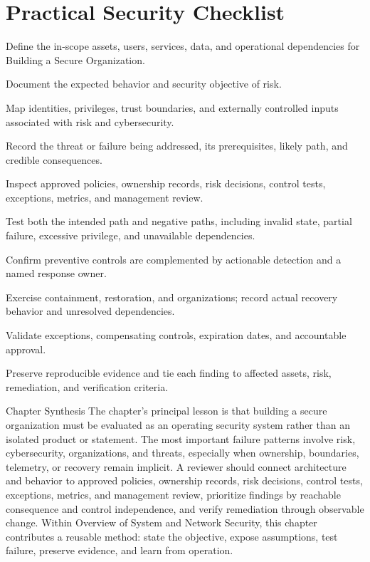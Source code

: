 \documentclass[11pt,letterpaper]{article}
\begin{document}
\section*{Practical Security Checklist}
\begin{CornellChecklist}
\item Define the in-scope assets, users, services, data, and operational dependencies for Building a Secure Organization.
\item Document the expected behavior and security objective of risk.
\item Map identities, privileges, trust boundaries, and externally controlled inputs associated with risk and cybersecurity.
\item Record the threat or failure being addressed, its prerequisites, likely path, and credible consequences.
\item Inspect approved policies, ownership records, risk decisions, control tests, exceptions, metrics, and management review.
\item Test both the intended path and negative paths, including invalid state, partial failure, excessive privilege, and unavailable dependencies.
\item Confirm preventive controls are complemented by actionable detection and a named response owner.
\item Exercise containment, restoration, and organizations; record actual recovery behavior and unresolved dependencies.
\item Validate exceptions, compensating controls, expiration dates, and accountable approval.
\item Preserve reproducible evidence and tie each finding to affected assets, risk, remediation, and verification criteria.
\end{CornellChecklist}
\begin{CornellSummaryBox}{Chapter Synthesis}
The chapter's principal lesson is that building a secure organization must be evaluated as an operating security system rather than an isolated product or statement. The most important failure patterns involve risk, cybersecurity, organizations, and threats, especially when ownership, boundaries, telemetry, or recovery remain implicit. A reviewer should connect architecture and behavior to approved policies, ownership records, risk decisions, control tests, exceptions, metrics, and management review, prioritize findings by reachable consequence and control independence, and verify remediation through observable change. Within Overview of System and Network Security, this chapter contributes a reusable method: state the objective, expose assumptions, test failure, preserve evidence, and learn from operation.
\end{CornellSummaryBox}
\end{document}

